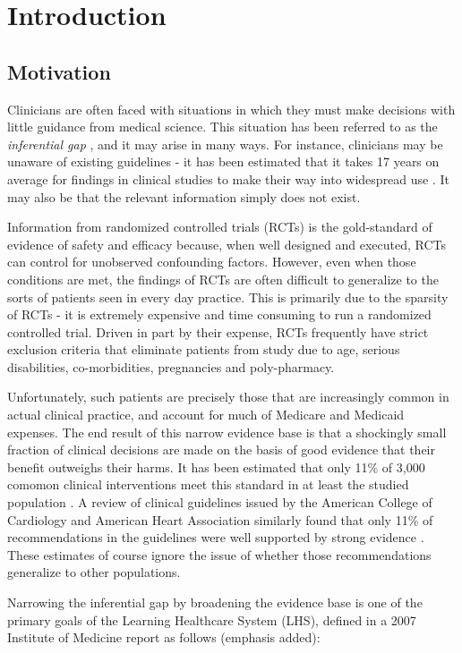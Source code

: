 \chapter{Introduction}

\section{Motivation}
Clinicians are often faced with situations in which they must make
decisions with little guidance from medical science.  This situation
has been referred to as the \emph{inferential gap}
\cite{InferentialGap}, and it may arise in many ways.  For instance,
clinicians may be unaware of existing guidelines - it has been
estimated that it takes 17 years on average for findings in clinical
studies to make their way into widespread use \cite{Balas2000}.  It
may also be that the relevant information simply does not exist.

Information from randomized controlled trials (RCTs) is the
gold-standard of evidence of safety and efficacy because, when well
designed and executed, RCTs can control for unobserved confounding
factors.  However, even when those conditions are met, the findings of
RCTs are often difficult to generalize to the sorts of patients seen
in every day practice.  This is primarily due to the sparsity of RCTs
- it is extremely expensive and time consuming to run a randomized
controlled trial.  Driven in part by their expense, RCTs
frequently have strict exclusion criteria that eliminate patients from
study due to age, serious disabilities, co-morbidities, pregnancies
and poly-pharmacy.

Unfortunately, such patients are precisely those that are increasingly
common in actual clinical practice, and account for much of Medicare
and Medicaid expenses.  The end result of this narrow evidence base is
that a shockingly small fraction of clinical decisions are made on the
basis of good evidence that their benefit outweighs their harms.  It
has been estimated that only 11\% of 3,000 comomon clinical
interventions meet this standard in at least the studied population
\cite{BMJClinicalEvidence}.  A review of clinical guidelines issued by
the American College of Cardiology and American Heart Association
similarly found that only 11\% of recommendations in the guidelines
were well supported by strong evidence \cite{Tricoci2009}.  These
estimates of course ignore the issue of whether those recommendations
generalize to other populations.  

Narrowing the inferential gap by broadening the evidence base is one
of the primary goals of the Learning Healthcare System (LHS), defined
in a 2007 Institute of Medicine report \cite{IOM2007LHC,Etheredge2014}
as follows (emphasis added):

